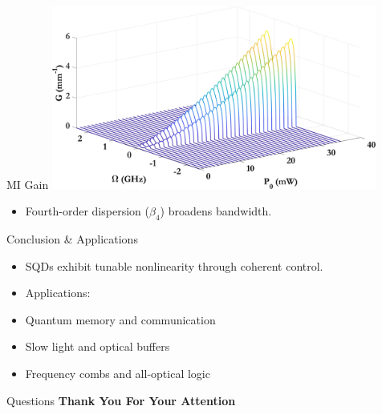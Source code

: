 \documentclass[12pt,aspectratio=1610]{beamer}
\begin{document}
\begin{frame}{MI Gain}
  \vspace{-12pt}
  \hspace*{40pt}
  \includegraphics[width=0.8\textwidth]{Assets/Beta2_Kerr.jpeg}
  \begin{itemize}
    \item Fourth-order dispersion ($\beta_4$) broadens bandwidth.
  \end{itemize}
\end{frame}

\begin{frame}{Conclusion \& Applications}
  \begin{itemize}
    \item SQDs exhibit tunable nonlinearity through coherent control.
    \item Applications:
    \item Quantum memory and communication
    \item Slow light and optical buffers
    \item Frequency combs and all-optical logic
  \end{itemize}
\end{frame}

\begin{frame}{Questions}
  \centering
  {\Huge \bfseries Thank You For Your Attention}
\end{frame}
\end{document}
